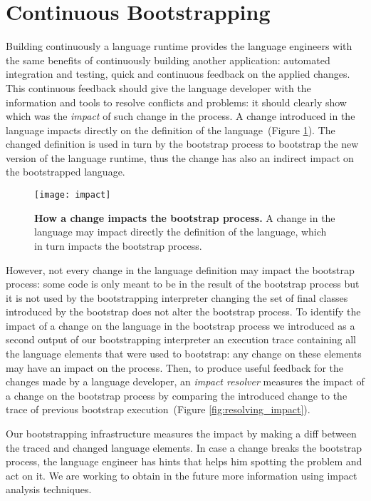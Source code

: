 \section{Continuous Bootstrapping}\label{sec:continuous_bootstrapping}

Building continuously a language runtime provides the language engineers with the same benefits of continuously building another application: automated integration and testing, quick and continuous feedback on the applied changes. This continuous feedback should give the language developer with the information and tools to resolve conflicts and problems: it should clearly show which was the \emph{impact} of such change in the process. A change introduced in the language impacts directly on the definition of the language~(Figure \ref{fig:impact}). The changed definition is used in turn by the bootstrap process to bootstrap the new version of the language runtime, thus the change has also an indirect impact on the bootstrapped language. 

\begin{figure}[ht]
\center
\texttt{[image: impact]}
\caption{\textbf{How a change impacts the bootstrap process.} A change in the language may impact directly the definition of the language, which in turn impacts the bootstrap process.\label{fig:impact}}
\end{figure}

However, not every change in the language definition may impact the bootstrap process: some code is only meant to be in the result of the bootstrap process but it is not used by the bootstrapping interpreter \eg changing the set of final classes introduced by the bootstrap does not alter the bootstrap process. To identify the impact of a change on the language in the bootstrap process we introduced as a second output of our bootstrapping interpreter an execution trace containing all the language elements that were used to bootstrap: any change on these elements may have an impact on the process. Then, to produce useful feedback for the changes made by a language developer, an \emph{impact resolver} measures the impact of a change on the bootstrap process by comparing the introduced change to the trace of previous bootstrap execution~(Figure \ref{fig:resolving_impact}).

Our bootstrapping infrastructure measures the impact by making a diff between the traced and changed language elements. In case a change breaks the bootstrap process, the language engineer has hints that helps him spotting the problem and act on it. We are working to obtain in the future more information using impact analysis techniques.

